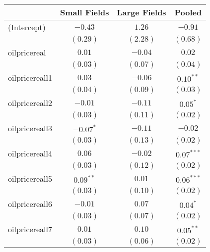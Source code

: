 \documentclass[12pt]{article}
\begin{document}

\begin{table}
\begin{center}
\begin{tabular}{l c c c }
\hline
                                     & Small Fields & Large Fields & Pooled \\
\hline
(Intercept)                          & $-0.43$       & $1.26$        & $-0.91$       \\
                                     & $(0.29)$      & $(2.28)$      & $(0.68)$      \\
oilpricereal                       & $0.01$        & $-0.04$       & $0.02$        \\
                                     & $(0.03)$      & $(0.07)$      & $(0.04)$      \\
oilpricereall1                    & $0.03$        & $-0.06$       & $0.10^{**}$   \\
                                     & $(0.04)$      & $(0.09)$      & $(0.03)$      \\
oilpricereall2                    & $-0.01$       & $-0.11$       & $0.05^{*}$    \\
                                     & $(0.03)$      & $(0.11)$      & $(0.02)$      \\
oilpricereall3                    & $-0.07^{*}$   & $-0.11$       & $-0.02$       \\
                                     & $(0.03)$      & $(0.13)$      & $(0.02)$      \\
oilpricereall4                    & $0.06$        & $-0.02$       & $0.07^{***}$  \\
                                     & $(0.03)$      & $(0.12)$      & $(0.02)$      \\
oilpricereall5                    & $0.09^{**}$   & $0.01$        & $0.06^{***}$  \\
                                     & $(0.03)$      & $(0.10)$      & $(0.02)$      \\
oilpricereall6                    & $-0.01$       & $0.07$        & $0.04^{*}$    \\
                                     & $(0.03)$      & $(0.07)$      & $(0.02)$      \\
oilpricereall7                    & $0.01$        & $0.10$        & $0.05^{**}$   \\
                                     & $(0.03)$      & $(0.06)$      & $(0.02)$      \\

\end{tabular}
\end{center}
\end{table}
\end{document}
